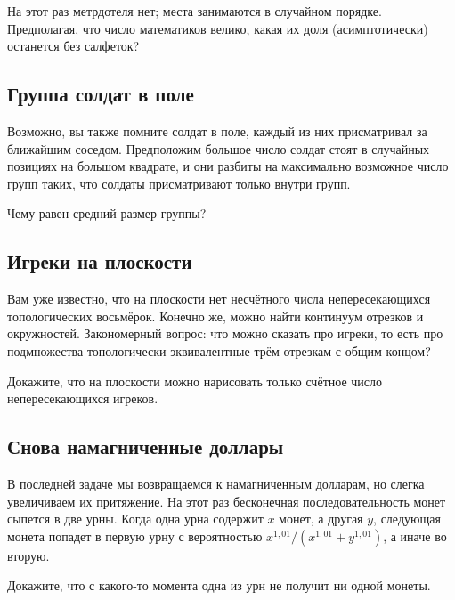 На этот раз метрдотеля нет; места занимаются в случайном порядке.
Предполагая, что число математиков велико, какая их доля (асимптотически) останется без салфеток?

\subsection*{Группа солдат в поле}

Возможно, вы также помните солдат в поле, каждый из них присматривал за ближайшим соседом.
Предположим большое число солдат стоят в случайных позициях на большом квадрате, и они разбиты на максимально возможное число групп таких, что солдаты присматривают только внутри групп.

Чему равен средний размер группы?

\subsection*{Игреки на плоскости}

Вам уже известно, что на плоскости нет несчётного числа непересекающихся топологических восьмёрок.
Конечно же, можно найти континуум отрезков и окружностей.
Закономерный вопрос: что можно сказать про игреки, то есть про подмножества топологически эквивалентные трём отрезкам с общим концом?

Докажите, что на плоскости можно нарисовать только счётное число непересекающихся игреков.

\subsection*{Снова намагниченные доллары}

В последней задаче мы возвращаемся к намагниченным долларам, но слегка увеличиваем их притяжение.
На этот раз бесконечная последовательность монет сыпется в две урны.
Когда одна урна содержит $x$ монет, а другая $y$, следующая монета попадет в первую урну с вероятностью $x^{1{,}01}/(x^{1{,}01}+y^{1{,}01})$, а иначе во вторую.

Докажите, что с какого-то момента одна из урн не получит ни одной монеты.

